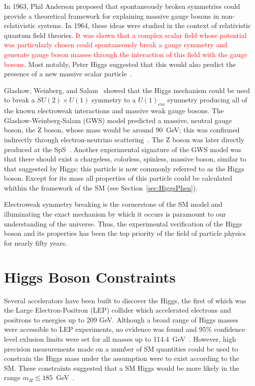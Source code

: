 In 1963, Phil Anderson proposed that spontaneously
broken symmetries could provide a theoretical framework for
explaining massive gauge bosons in non-relativistic
systems\cite{Anderson:1963pc}. In 1964,
these ideas were studied in the context of relativistic quantum field theories.  \textcolor{red}{It was shown that a complex 
scalar field whose potential was particularly chosen could spontaneously 
break a gauge symmetry and generate gauge boson masses through the 
interaction of this field with the gauge 
bosons\cite{Higgs:1964,Englert:1964,Higgs:1964-2,Guralnik:1964}}.  Most notably, 
Peter Higgs suggested that this would also predict the presence
of a new massive scalar particle~\cite{Higgs:1964-2}.

Glashow, Weinberg, and
Salam~\cite{Glashow:1961,Weinberg:1967,Salam:1968} 
showed that the Higgs mechanism could be used to break a
$SU(2)\times U(1)$ symmetry to a $U(1)_{em}$ symmetry producing all
of the known electroweak interactions and massive 
weak gauge bosons. The Glashow-Weinberg-Salam (GWS) model predicted
a massive, neutral gauge boson, the Z boson,
whose mass would be around 90~GeV; this was confirmed
indirectly through electron-neutrino 
scattering~\cite{Hasert:1973,Hasert:1973-2,Hasert:1974}.  
The Z boson was later directly produced at the SpS~\cite{??}.
Another experimental signature of the GWS model was that there
should exist a chargeless,
colorless, spinless, massive boson, similar to that suggested by Higgs; this particle is now commonly referred to as the Higgs boson.
Except for its mass all properties of this particle could be
calculated whithin the framework of the SM (see
Section~\ref{sec:HiggsPhen}).  

Electroweak symmetry breaking is the cornerstone of the SM model
and illuminating the exact mechanism by which it occurs is
paramount to our understanding of the universe.  Thus, the
experimental verification of the Higgs boson and its properties
has been the top priority of the field of particle physics for
nearly fifty years.

\section{Higgs Boson Constraints}
\label{sec:The Higgs boson}

Several accelerators have been built to discover the Higgs,   
the first of which was the Large Electron-Positron (LEP) collider
which accelerated electrons and positrons to energies up to 209 GeV.
Although a broad range of Higgs masses 
were accessible to LEP experiments, no evidence was found and 
95\% confidence level exlusion limits were set for all masses up to 114.4~GeV~\cite{Barate:2003sz}.
However, high precision
measurements made on a number of SM 
quantities could be used to constrain the Higgs mass under the
assumption were to exist according to the SM.  These constraints
suggested that a SM Higgs would be more likely in the range
$m_H\lesssim185$~GeV~\cite{Group:2008aa}.  

